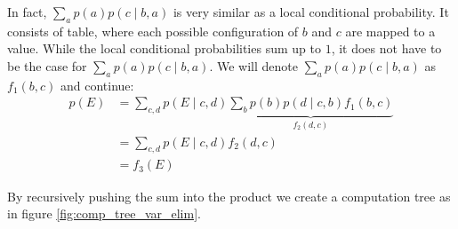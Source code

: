 \noindent
In fact, $\sum_a p(a)p(c \mid b, a)$ is very similar as a
local conditional probability. It consists of table, where each
possible configuration of $b$ and $c$ are mapped to a value.
While the local conditional probabilities sum up to $1$,
it does not have to be the case for $\sum_a p(a)p(c \mid b,a)$.
We will denote $\sum_a p(a) p(c\mid b, a)$ as $f_1(b, c)$ and 
continue:
\begin{equation}\begin{split}
p(E) 
	&= \sum_{c, d} p(E \mid c, d)
		\underbrace{\sum_b p(b)p(d \mid c, b)f_1(b, c)}_{f_2(d, c)}\\
	&= \sum_{c, d} p(E \mid c, d)f_2(d, c)\\
	&= f_3(E)
\end{split}\end{equation}

\noindent
By recursively pushing the sum into the product we create 
a computation tree as in figure \ref{fig:comp_tree_var_elim}.

